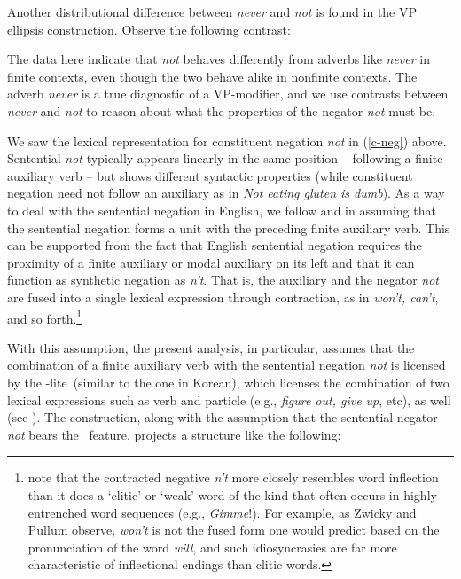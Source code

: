 \documentclass[output=paper]{langsci/langscibook}
\begin{document}
{\begin{exe}
\begin{xlist}
\begin{exe}
\begin{xlist}
Another distributional difference between \emph{never} and \emph{not} is found in
the VP ellipsis construction.  Observe the following
contrast:

\eal
\label{vpe-not-ex}
\zl


%
The data here indicate that \emph{not} behaves differently from
adverbs like \emph{never} in finite contexts, even though the two
behave alike in nonfinite contexts. The adverb \emph{never} is a true
diagnostic of a VP-modifier, and we use contrasts between \emph{never} and \emph{not} to reason about what the properties of
the negator \emph{not} must be.


We saw the lexical representation for constituent negation
\emph{not} in (\ref{c-neg}) above.
 Sentential \emph{not} typically appears linearly in the
same position -- following a finite auxiliary verb -- but shows
different syntactic properties (while
 constituent negation need not follow an auxiliary
 as in \emph{Not eating gluten is dumb}).
 As a way
 to deal with the sentential negation in English,
  we follow \citet{Bresnan:01} and \citet{KM} in assuming that the sentential negation forms a unit with the preceding
finite auxiliary verb.  This can be supported from
the fact that English sentential negation requires the proximity of
a finite auxiliary or modal auxiliary on its left and that it can function as synthetic negation as \emph{n't}. That is, the auxiliary and the negator \emph{not} are fused into a single lexical
expression through contraction, as in \emph{won't, can't},
and so forth.\footnote{\citet{ZP:83} note that the contracted
negative \emph{n't} more closely
resembles word inflection than it does a `clitic' or `weak' word of
the kind that often occurs in highly entrenched word sequences
(e.g., \emph{Gimme}!). For example, as Zwicky and Pullum observe,
\emph{won't} is not the fused form one would predict based on
the pronunciation of the word \emph{will}, and such idiosyncrasies are far more characteristic of inflectional endings than clitic words.}



 With this assumption, the
present analysis, in particular, assumes that
the combination of a finite auxiliary verb with the sentential
negation \emph{not} is licensed by the \hd-lite\ (similar to the one
in Korean), which licenses
the combination of two lexical expressions such as verb and particle (e.g., \emph{figure out, give up}, etc), as well (see \citet{KM}). The construction, along with the assumption that the sentential negator \emph{not}
bears the \LEX\ feature, projects a structure like the following:


\end{xlist}
\end{exe}
\end{xlist}
\end{exe}}
\end{document}
